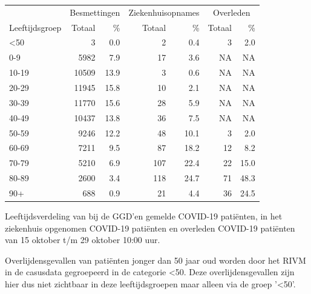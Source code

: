 \documentclass[
  english,
  man,floatsintext]{apa6}
\begin{document}
\begin{table}
\centering\begingroup\fontsize{11}{13}\selectfont

\begin{threeparttable}
\begin{tabular}{lrrrrrr}
\toprule
\multicolumn{1}{c}{ } & \multicolumn{2}{c}{Besmettingen} & \multicolumn{2}{c}{Ziekenhuisopnames} & \multicolumn{2}{c}{Overleden} \\
\cmidrule(l{3pt}r{3pt}){2-3} \cmidrule(l{3pt}r{3pt}){4-5} \cmidrule(l{3pt}r{3pt}){6-7}
Leeftijdsgroep & Totaal & \% & Totaal & \% & Totaal & \%\\
\midrule
<50 & 3 & 0.0 & 2 & 0.4 & 3 & 2.0\\
0-9 & 5982 & 7.9 & 17 & 3.6 & NA & NA\\
10-19 & 10509 & 13.9 & 3 & 0.6 & NA & NA\\
20-29 & 11945 & 15.8 & 10 & 2.1 & NA & NA\\
30-39 & 11770 & 15.6 & 28 & 5.9 & NA & NA\\
40-49 & 10437 & 13.8 & 36 & 7.5 & NA & NA\\
50-59 & 9246 & 12.2 & 48 & 10.1 & 3 & 2.0\\
60-69 & 7211 & 9.5 & 87 & 18.2 & 12 & 8.2\\
70-79 & 5210 & 6.9 & 107 & 22.4 & 22 & 15.0\\
80-89 & 2600 & 3.4 & 118 & 24.7 & 71 & 48.3\\
90+ & 688 & 0.9 & 21 & 4.4 & 36 & 24.5\\
\bottomrule
\end{tabular}
\begin{tablenotes}
\item[1] Leeftijdsverdeling van bij de GGD’en gemelde COVID-19 patiënten, in het ziekenhuis opgenomen COVID-19 patiënten en overleden COVID-19 patiënten van 15 oktober t/m 29 oktober 10:00 uur.
\item[2] Overlijdensgevallen van patiënten jonger dan 50 jaar oud worden door het RIVM in de casusdata gegroepeerd in de categorie <50. Deze overlijdensgevallen zijn hier dus niet zichtbaar in deze leeftijdsgroepen maar alleen via de groep '<50'.
\end{tablenotes}
\end{threeparttable}
\endgroup{}
\end{table}

\newpage
\end{document}
